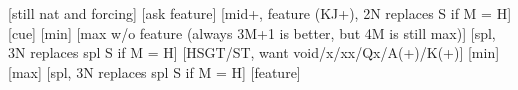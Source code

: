 \begin{bidsemi}
[still nat and forcing]
[ask feature]
    [mid+, feature (KJ+), 2N replaces S if M = H]
        [cue]
    [min]
    [max w/o feature (always 3M+1 is better, but 4M is still max)]
    [spl, 3N replaces spl S if M = H]
[HSGT/ST, want void/x/xx/Qx/A(+)/K(+)]
    [min]
    [max]
    [spl, 3N replaces spl S if M = H]
    [feature]
\end{bidsemi}